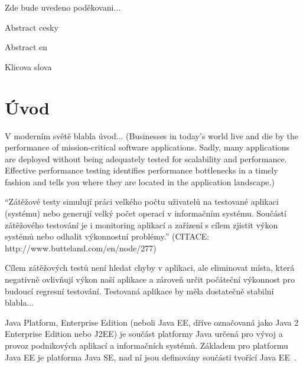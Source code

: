 \documentclass[122pt,oneside]{fithesis}
\begin{document}
\FrontMatter
\ThesisTitlePage

\begin{ThesisDeclaration}
\DeclarationText
\AdvisorName
\end{ThesisDeclaration}

\begin{ThesisThanks}
Zde bude uvedeno poděkovani...
\end{ThesisThanks}

\begin{ThesisAbstract}
Abstract cesky
\end{ThesisAbstract}

\begin{ThesisAbstracten}
Abstract en
\end{ThesisAbstracten}

\begin{ThesisKeyWords}
Klicova slova
\end{ThesisKeyWords}

\MainMatter
\tableofcontents

\chapter*{Úvod}

V moderním světě blabla úvod... (Businesses in today's world live and die by the performance of mission-critical software applications. Sadly, many applications are deployed without being adequately tested for scalability and performance. Effective performance testing identifies performance bottlenecks in a timely fashion and tells you where they are located in the application landscape.)

“Zátěžové testy simulují práci velkého počtu uživatelů na testované aplikaci (systému) nebo generují velký počet operací v informačním systému. Součástí zátěžového testování je i monitoring aplikací a zařízení s cílem zjistit výkon systémů nebo odhalit výkonnostní problémy.” (CITACE: http://www.butteland.com/en/node/277)

Cílem zátěžových testů není hledat chyby v aplikaci, ale eliminovat místa, která negativně ovlivňují výkon naší aplikace a zároveň určit počáteční výkonnost pro budoucí regresní testování. Testovaná aplikace by měla dostatečně stabilní blabla...

Java Platform, Enterprise Edition (neboli Java EE, dříve označovaná jako Java 2 Enterprise Edition nebo J2EE) je součást platformy Java určená pro vývoj a provoz podnikových aplikací a informačních systémů. Základem pro platformu Java EE je platforma Java SE, nad ní jsou definovány součásti tvořící Java EE~\cite{wikiJavaEE}.
\end{document}
